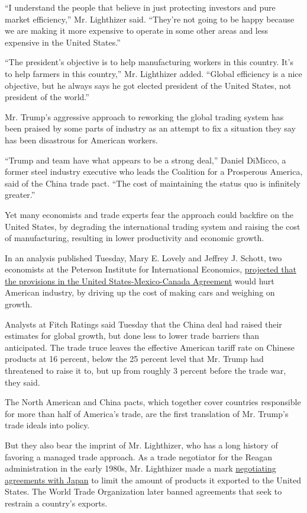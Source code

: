 ``I understand the people that believe in just protecting investors and
pure market efficiency,'' Mr. Lighthizer said. ``They're not going to be
happy because we are making it more expensive to operate in some other
areas and less expensive in the United States.''

``The president's objective is to help manufacturing workers in this
country. It's to help farmers in this country,'' Mr. Lighthizer added.
``Global efficiency is a nice objective, but he always says he got
elected president of the United States, not president of the world.''

Mr. Trump's aggressive approach to reworking the global trading system
has been praised by some parts of industry as an attempt to fix a
situation they say has been disastrous for American workers.

``Trump and team have what appears to be a strong deal,'' Daniel
DiMicco, a former steel industry executive who leads the Coalition for a
Prosperous America, said of the China trade pact. ``The cost of
maintaining the status quo is infinitely greater.''

Yet many economists and trade experts fear the approach could backfire
on the United States, by degrading the international trading system and
raising the cost of manufacturing, resulting in lower productivity and
economic growth.

In an analysis published Tuesday, Mary E. Lovely and Jeffrey J. Schott,
two economists at the Peterson Institute for International Economics,
\href{https://www.piie.com/blogs/trade-and-investment-policy-watch/usmca-new-modestly-improved-still-costly}{projected
that the provisions in the United States-Mexico-Canada Agreement} would
hurt American industry, by driving up the cost of making cars and
weighing on growth.

Analysts at Fitch Ratings said Tuesday that the China deal had raised
their estimates for global growth, but done less to lower trade barriers
than anticipated. The trade truce leaves the effective American tariff
rate on Chinese products at 16 percent, below the 25 percent level that
Mr. Trump had threatened to raise it to, but up from roughly 3 percent
before the trade war, they said.

The North American and China pacts, which together cover countries
responsible for more than half of America's trade, are the first
translation of Mr. Trump's trade ideals into policy.

But they also bear the imprint of Mr. Lighthizer, who has a long history
of favoring a managed trade approach. As a trade negotiator for the
Reagan administration in the early 1980s, Mr. Lighthizer made a mark
\href{https://www.nytimes3xbfgragh.onion/1984/09/30/business/the-steel-trade-negotiations-the-experts-who-will-forge-the-new-quotas.html}{negotiating
agreements with Japan} to limit the amount of products it exported to
the United States. The World Trade Organization later banned agreements
that seek to restrain a country's exports.

